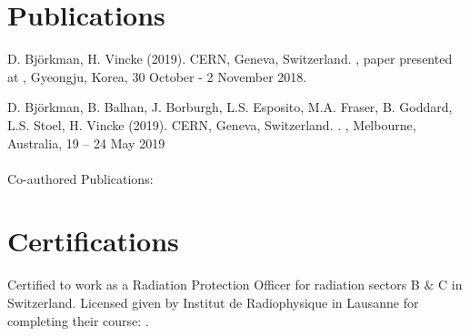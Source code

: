 \documentclass[a4paper,10pt]{article}
\newcommand{\MYhref}[3][blue]{\href{#2}{\color{#1}{#3}}}%
\begin{document}
\section{Publications}
{\small 
\begin{enumerate}[label={[\arabic*]}]
  \item D. Björkman, H. Vincke (2019). CERN, Geneva, Switzerland. \MYhref{https://www.oecd-nea.org/science/wprs/egsaatif/}{"High Energy Internal Beam Dump System for the Super Proton Synchrotron"}, paper presented at , Gyeongju, Korea, 30 October - 2 November 2018.
 
  \item D. Björkman, B. Balhan, J. Borburgh, L.S. Esposito, M.A. Fraser, B. Goddard, L.S. Stoel, H. Vincke (2019).   CERN, Geneva, Switzerland. \MYhref{http://accelconf.web.cern.ch/AccelConf/ipac2019/papers/wepmp024.pdf}{"Alternative Material Choices to Reduce Activation of Extraction Equipment"}. , Melbourne, Australia, 19 – 24 May 2019 \\
  \\
  \hspace{7.5mm} Co-authored Publications:
   \item \MYhref{https://inspirehep.net/literature/1626372}{"SPS Slow Extraction Losses and Activation: Challenges and Possibilities for Improvemen"}
   \item \MYhref{https://cds.cern.ch/record/2668989}{"Improvements to the SPS Slow Extraction for High Intensity Operation"}
  \item \MYhref{https://ipac2019.vrws.de/papers/wepmp031.pdf}{"SPS Slow Extraction Losses and Activation: Update on Recent Improvements"}
  \item \MYhref{https://edms.cern.ch/document/2369601/1}{D. Björkman et al. (TBP 2020). "Residual Dose Rate measurements and FLUKA predictions for the ATLAS experiment in Long Shut-Down 2 after 6 months of cool-down", EDMS 2369601}  
  
  
\end{enumerate}


 
\section{Certifications}
Certified to work as a Radiation Protection Officer for radiation sectors B $\&$ C in Switzerland. Licensed given by Institut de Radiophysique in Lausanne for completing their course: \MYhref{ https://fmp16srvprd.unil.ch/fmi/webd/IRA_Cours_radioprotection}{\textsc{Radiation Protection Expert}}.
 
}
\end{document}
